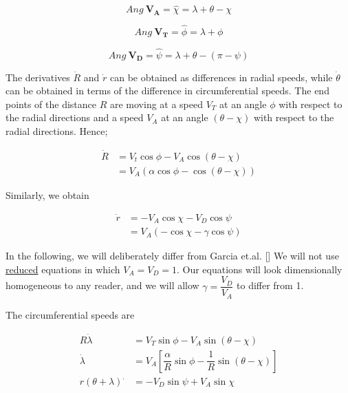\begin{equation}
	Ang\ \boldsymbol{V_A} = \hat{\chi} = \lambda+\theta-\chi
\end{equation}

\begin{equation}
Ang\ \boldsymbol{V_T} = \hat{\phi} = \lambda+\phi
\end{equation}

\begin{equation}
Ang\ \boldsymbol{V_D} = \hat{\psi} = \lambda+\theta-(\pi - \psi)
\end{equation}



The derivatives $\dot{R}$ and $\dot{r}$ can be obtained as differences in radial speeds, while $\dot{\theta}$ can be obtained in terms of the difference in circumferential speeds. The end points of the distance $R$ are moving at a speed $V_T$ at an angle $\phi$ with respect to the radial directions and a speed $V_A$ at an angle $(\theta - \chi)$ with respect to the radial directions. Hence;

\begin{equation}
\begin{split}
\dot{R} &= V_t \cos \phi - V_A \cos(\theta - \chi)\\
&= V_A (\alpha \cos \phi - \cos(\theta - \chi))
\end{split}
\label{Rdot}
\end{equation}

Similarly, we obtain 

\begin{equation}
\begin{split}
\dot{r} &= -V_A \cos \chi - V_D \cos\psi\\
&= V_A (- \cos \chi - \gamma\cos\psi)
\end{split}
\label{rdot}
\end{equation}

In the following, we will deliberately differ from Garcia et.al. []
We will not use \underline{reduced} equations in which $V_A = V_D = 1$.
Our equations will look dimensionally homogeneous to any reader, and we will allow $\gamma = \dfrac{V_D}{V_A}$ to differ from 1.

The circumferential speeds are

\begin{equation*}
\begin{split}
R \dot{\lambda}& = V_T \sin \phi - V_A \sin (\theta - \chi)\\
\dot{\lambda} &= V_A [\dfrac{\alpha}{R} \sin \phi - \dfrac{1}{R} \sin (\theta - \chi)]\\
r (\theta + \lambda)^. &= - V_D \sin \psi + V_A \sin \chi
\end{split}
\end{equation*}  


